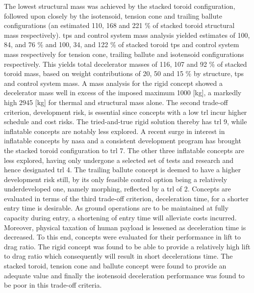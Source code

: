The lowest structural mass was achieved by the stacked toroid configuration, followed upon closely by the isotensoid, tension cone and trailing ballute configurations (an estimated 110, 168 and 221 \% of stacked toroid structural mass respectively). \acrfull{tps} and control system mass analysis yielded estimates of 100, 84, and 76 \% and 100, 34, and 122 \% of stacked toroid \gls{tps} and control system mass respectively for tension cone, trailing ballute and isotensoid configurations respectively. This yields total decelerator masses of 116, 107 and 92 \% of stacked toroid mass, based on weight contributions of 20, 50 and 15 \% by structure, \gls{tps} and control system mass. A mass analysis for the rigid concept showed a decelerator mass well in excess of the imposed maximum 1000 [kg], a markedly high 2945 [kg] for thermal and structural mass alone.
\newline
\newline
The second trade-off criterion, development risk, is essential since concepts with a low \acrfull{trl} incur higher schedule and cost risks. The tried-and-true rigid solution thereby has \gls{trl} 9, while inflatable concepts are notably less explored. A recent surge in interest in inflatable concepts by \gls{nasa} and a consistent development program has brought the stacked toroid configuration to \gls{trl} 7. The other three inflatable concepts are less explored, having only undergone a selected set of tests and research and hence designated \gls{trl} 4. The trailing ballute concept is deemed to have a higher development risk still, by its only feasible control option being a relatively underdeveloped one, namely morphing, reflected by a \gls{trl} of 2.
\newline
\newline
Concepts are evaluated in terms of the third trade-off criterion, deceleration time, for a shorter entry time is desirable. As ground operations are to be maintained at fully capacity during entry, a shortening of entry time will alleviate costs incurred. Moreover, physical taxation of human payload is lessened as deceleration time is decreased. To this end, concepts were evaluated for their performance in lift to drag ratio. The rigid concept was found to be able to provide a relatively high lift to drag ratio which consequently will result in short decelerations time. The stacked toroid, tension cone and ballute concept were found to provide an adequate value and finally the isotensoid deceleration performance was found to be poor in this trade-off criteria.

